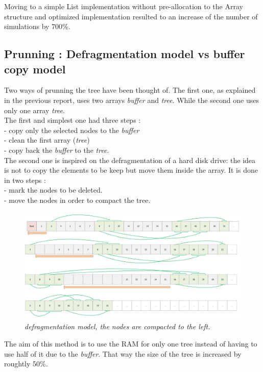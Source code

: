 Moving to a simple List implementation without pre-allocation to the Array structure and optimized implementation resulted to an increase of the number of simulations by 700\%.

\subsection{Prunning : Defragmentation model vs buffer copy model}

Two ways of prunning the tree have been thought of. The first one, as  explained in the previous report, uses two arrays \textit{buffer} and \textit{tree}. While the second one uses only one array \textit{tree}.
\medskip\\
The first and simplest one had three steps : \\
- copy only the selected nodes to the \textit{buffer} \\
- clean the first array (\textit{tree}) \\
- copy back the \textit{buffer} to the \textit{tree}.
\medskip\\
The second one is inspired on the defragmentation of a hard disk drive: the idea is not to copy the elements to be keep but move them inside the array. It is done in two steps : \\
- mark the nodes to be deleted. \\
- move the nodes in order to compact the tree.
\begin{figure}[H] 
\centerline{\includegraphics[width=\textwidth]{Optimisations/array.png}}
\caption{\label{fig:Defrag}\textit{defragmentation model, the nodes are compacted to the left.}}
\end{figure}
The aim of this method is to use the RAM for only one tree instead of having to use half of it due to the \textit{buffer}. That way the size of the tree is increased by roughtly 50\%.

